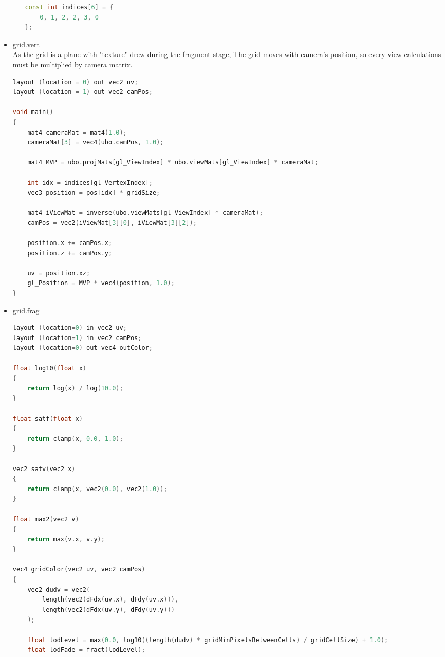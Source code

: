 \begin{itemize}
\begin{itemize}
\begin{lstlisting}[language=c++, caption=Grid shader parameters(./assets/shaders/grid\_params.h)]
const int indices[6] = {
    0, 1, 2, 2, 3, 0
};
\end{lstlisting}
    \end{itemize}
    \item grid.vert\\
    As the grid is a plane with "texture" drew during the fragment stage,
    The grid moves with camera's position, so every view calculations must be multiplied by camera matrix. 
\begin{lstlisting}[language=c++, caption=(./assets/shaders/grid.vert)]
layout (location = 0) out vec2 uv;
layout (location = 1) out vec2 camPos;

void main()
{
    mat4 cameraMat = mat4(1.0);
    cameraMat[3] = vec4(ubo.camPos, 1.0);

    mat4 MVP = ubo.projMats[gl_ViewIndex] * ubo.viewMats[gl_ViewIndex] * cameraMat;

    int idx = indices[gl_VertexIndex];
    vec3 position = pos[idx] * gridSize;

    mat4 iViewMat = inverse(ubo.viewMats[gl_ViewIndex] * cameraMat);
    camPos = vec2(iViewMat[3][0], iViewMat[3][2]);

    position.x += camPos.x;
    position.z += camPos.y;

    uv = position.xz;
    gl_Position = MVP * vec4(position, 1.0);
}
\end{lstlisting}
    \item grid.frag\\
\begin{lstlisting}[language=c++, caption=Grid fragment shader(./assets/shaders/grid.frag)]
layout (location=0) in vec2 uv;
layout (location=1) in vec2 camPos;
layout (location=0) out vec4 outColor;

float log10(float x)
{
    return log(x) / log(10.0);
}

float satf(float x)
{
    return clamp(x, 0.0, 1.0);
}

vec2 satv(vec2 x)
{
    return clamp(x, vec2(0.0), vec2(1.0));
}

float max2(vec2 v)
{
    return max(v.x, v.y);
}

vec4 gridColor(vec2 uv, vec2 camPos)
{
    vec2 dudv = vec2(
        length(vec2(dFdx(uv.x), dFdy(uv.x))),
        length(vec2(dFdx(uv.y), dFdy(uv.y)))
    );

    float lodLevel = max(0.0, log10((length(dudv) * gridMinPixelsBetweenCells) / gridCellSize) + 1.0);
    float lodFade = fract(lodLevel);


\end{lstlisting}
\end{itemize}

